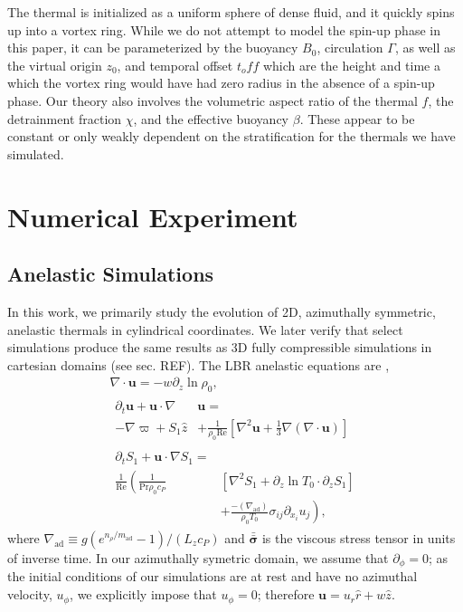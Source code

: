 \documentclass[twocolumn, amsmath, amsfonts, amssymb, trackchanges]{aastex62}
\newcommand{\DivU}{\ensuremath{\nabla\cdot\bm{u}}}
\newcommand{\grad}{\ensuremath{\nabla}}
\newcommand{\lilstressT}{\ensuremath{\bm{\bar{\bar{\sigma}}}}}
\begin{document}
The thermal is initialized as a uniform sphere of dense fluid, and it quickly spins up into a vortex ring. 
While we do not attempt to model the spin-up phase in this paper, it can be parameterized by the buoyancy $B_0$, circulation $\Gamma$, as well as the virtual origin $z_0$, and temporal offset $t_off$ which are the height and time a which the vortex ring would have had zero radius in the absence of a spin-up phase. 
Our theory also involves the volumetric aspect ratio of the thermal $f$, the detrainment fraction $\chi$, and the effective buoyancy $\beta$. 
These appear to be constant or only weakly dependent on the stratification for the thermals we have simulated.


\section{Numerical Experiment} 
\label{sec:experiment}


\subsection{Anelastic Simulations}
In this work, we primarily study the evolution of 2D, azimuthally symmetric, anelastic thermals in cylindrical coordinates. 
We later verify that select simulations produce the same results as 3D fully compressible simulations in cartesian domains (see sec. REF). 
The LBR anelastic equations are \citep{lecoanet&all2014},
\begin{gather}
\DivU = -w \partial_z \ln\rho_0, \\
\begin{split}
\partial_t \bm{u} + \bm{u}\cdot\grad&\bm{u} = \\
- \grad \varpi + S_1\hat{z} &
+ \frac{1}{\rho_0\text{Re}}\left[\grad^2 \bm{u} + \frac{1}{3}\grad(\DivU)\right] 
\end{split}\\
\begin{split}
\partial_t S_1 + \bm{u}\cdot\grad S_1 =& \\
\frac{1}{\text{Re}}\left(\frac{1}{\text{Pr}\rho_0c_P }\right.&[\grad^2 S_1 + \partial_z\ln T_0 \cdot\partial_z S_1]\\
&+ \left.\frac{-(\grad_{\text{ad}})}{\rho_0 T_0}\sigma_{ij}\partial_{x_i}u_j \right),
\end{split}
\end{gather}
where $\grad_{\text{ad}} \equiv g(e^{n_\rho/m_{\text{ad}}} - 1)/(L_z c_P)$ and $\lilstressT$ is the viscous stress tensor in units of inverse time.
In our azimuthally symetric domain, we assume that $\partial_\phi = 0$; as the initial conditions of our simulations are at rest and have no azimuthal velocity, $u_\phi$, we explicitly impose that $u_\phi = 0$; therefore $\bm{u} = u_r \hat{r} + w\hat{z}$. 
\end{document}
